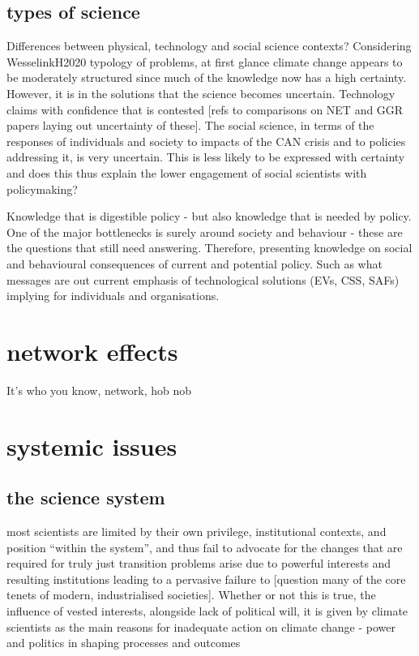 \subsection{types of science}
Differences between physical, technology and social science contexts?
Considering WesselinkH2020 typology of problems, at first glance climate change appears to be moderately structured since much of the knowledge now has a high certainty. However, it is in the solutions that the science becomes uncertain. Technology claims with confidence that is contested [refs to comparisons on NET and GGR papers laying out uncertainty of these]. The social science, in terms of the responses of individuals and society to impacts of the CAN crisis and to policies addressing it, is very uncertain. This is less likely to be expressed with certainty and does this thus explain the lower engagement of social scientists with policymaking?

Knowledge that is digestible policy - but also knowledge that is needed by policy. One of the major bottlenecks is surely around society and behaviour - these are the questions that still need answering. Therefore, presenting knowledge on social and behavioural consequences of current and potential policy. Such as what messages are out current emphasis of technological solutions (EVs, CSS, SAFs) implying for individuals and organisations.

\section{network effects}
It's who you know, network, hob nob


\section{systemic issues}
\subsection{the science system}
\cite{Bendell2024} most scientists are limited by their own privilege, institutional contexts, and position ``within the system'', and thus fail to advocate for the changes that are required for truly just transition  
\cite{StoddardEtAl2021} problems arise due to powerful interests and resulting institutions leading to a pervasive failure to [question many of the core tenets of modern, industrialised societies]. Whether or not this is true, the influence of vested interests, alongside lack of political will, it is given by climate scientists as the main reasons for inadequate action on climate change \cite{Carrington2024} 
\cite{TurnhoutMWKL2020} - power and politics in shaping processes and outcomes

